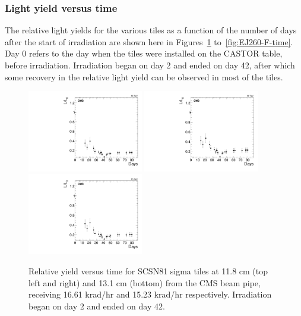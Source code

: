 \subsubsection{Light yield versus time\label{sec:ana-res-lyvstime}}

The relative light yields for the various tiles as a function of the number of days after the start of irradiation are shown here in Figures~\ref{fig:SCSN81-S-11p8cm-time} to~\ref{fig:EJ260-F-time}. Day 0 refers to the day when the tiles were installed on the CASTOR table, before irradiation. Irradiation began on day 2 and ended on day 42, after which some recovery in the relative light yield can be observed in most of the tiles.

\begin{figure}[tbp!]
\centering
\includegraphics[width=0.45\textwidth]{figures/SCSN81-S-11p8cm-f3ch0-time.pdf}
\includegraphics[width=0.45\textwidth]{figures/SCSN81-S-11p8cm-f20ch1-time.pdf}
\includegraphics[width=0.45\textwidth]{figures/SCSN81-S-13p1cm-f7ch5-time.pdf}
\caption{Relative yield versus time for SCSN81 sigma tiles at 11.8 cm (top left and right) and 13.1 cm (bottom) from the CMS beam pipe, receiving 16.61 krad/hr and 15.23 krad/hr respectively. Irradiation began on day 2 and ended on day 42.}
\label{fig:SCSN81-S-11p8cm-time}
\end{figure} 

